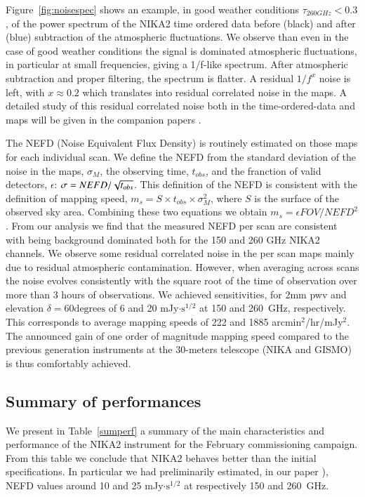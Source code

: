 \documentclass[]{aa} %
\begin{document}
Figure~\ref{fig:noisespec} shows an example, in good weather conditions $\tau_{260 GHz} < 0.3$, of the power spectrum of the NIKA2 time ordered data before (black) and after (blue) subtraction of the atmospheric fluctuations.
We observe than even in the case of good weather conditions the signal is dominated atmospheric fluctuations, in particular at small frequencies, giving a 1/f-like spectrum. After atmospheric subtraction and proper filtering, the spectrum is flatter. A residual $1/f^x$ noise is left, with $x \approx 0.2$ which translates into residual correlated noise in the maps. A detailed study of this residual correlated noise both in the time-ordered-data and maps will be given in the companion papers \cite{commissioning,pipeline}.

The NEFD (Noise Equivalent Flux Density) is routinely estimated on those maps for each individual scan. We define the NEFD from the standard deviation of the noise in the maps, $\sigma_{M}$, the observing time, $t_{obs}$, and the franction of valid detectors, $\epsilon$: $\sigma = NEFD / \sqrt{t_{obs} \time \epsilon}$. This definition of the NEFD is consistent with the definition of mapping speed, $m_{s} = S \times t_{obs} \times \sigma_{M}^{2}$, where $S$ is the surface of the observed sky area. Combining these two equations we obtain 
$m_{s} = \epsilon FOV / NEFD^2$.
From our analysis we find that the measured NEFD per scan are consistent with being background dominated both for the 150 and 260 GHz NIKA2 channels. We observe some residual correlated noise in the per scan maps mainly due to residual atmospheric contamination. However, when averaging across scans the noise evolves consistently with the square root of the time of observation over more than 3 hours of observations. We achieved sensitivities, for 2mm pwv and elevation $\delta = 60 \textrm{degrees}$ of 6 and 20 mJy$\cdot\textrm{s}^{1/2}$ at 150 and 260~GHz, respectively. This corresponds to average mapping speeds of 222 and 1885 arcmin$^2$/hr/mJy$^2$. The announced gain of one order of magnitude mapping speed compared to the previous generation instruments at the 30-meters telescope (NIKA and GISMO) is thus comfortably achieved. 

\subsection{Summary of performances}
We present in Table~\ref{sumperf} a summary of the main characteristics and performance of the NIKA2 instrument for the February commissioning campaign. From this table we conclude that NIKA2 behaves better than the initial specifications. In particular we had preliminarily estimated, in our paper \cite{Calvo2016}), NEFD values around 10 and 25 mJy$\cdot\textrm{s}^{1/2}$ at respectively 150 and 260~GHz.
\end{document}
